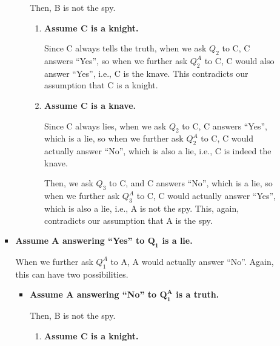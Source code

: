 \documentclass[answers]{exam}
\begin{document}
\begin{questions}
\begin{solution}
\begin{itemize}
\begin{itemize}
\begin{itemize}
\begin{itemize}
                        Then, B is not the spy.

                        \begin{enumerate}
                            \item \textbf{Assume C is a knight.}
                            
                            Since C always tells the truth, when we ask $Q_2$ to C, C answers
                            ``Yes'', so when we further ask $Q^A_2$ to C, C would also
                            answer ``Yes'', i.e., C is the knave. This contradicts our
                            assumption that C is a knight.

                            \item \textbf{Assume C is a knave.}
                            
                            Since C always lies, when we ask $Q_2$ to C, C answers ``Yes'',
                            which is a lie, so when we further ask $Q^A_2$ to C, C would
                            actually answer ``No'', which is also a lie, i.e., C is indeed
                            the knave.

                            Then, we ask $Q_3$ to C, and C answers ``No'', which is a lie,
                            so when we further ask $Q^A_3$ to C, C would actually answer
                            ``Yes'', which is also a lie, i.e., A is not the spy. This,
                            again, contradicts our assumption that A is the spy.
                        \end{enumerate}
                    \end{itemize}
                    
                    \item \textbf{Assume A answering ``Yes'' to $\bm{Q_1}$ is a lie.}
                    
                    When we further ask $Q^A_1$ to A, A would actually answer ``No''.
                    Again, this can have two possibilities.

                    \begin{itemize}
                        \item \textbf{Assume A answering ``No'' to $\bm{Q^A_1}$ is a truth.}
                        
                        Then, B is not the spy.

                        \begin{enumerate}
                            \item \textbf{Assume C is a knight.}
                            

\end{enumerate}
\end{itemize}
\end{itemize}
\end{itemize}
\end{itemize}
\end{solution}
\end{questions}
\end{document}
